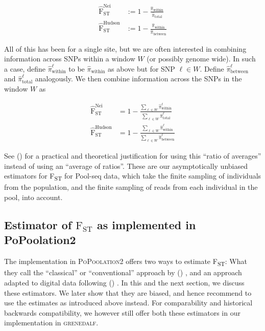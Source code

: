 \documentclass[a4paper,fontsize=9pt,DIV=14]{scrartcl}
\newcommand\citeay[1]{\citeauthor{#1} (\citeyear{#1}) \cite{#1}}
\newcommand\toolname{\textsc}
\newcommand{\fst}{F\textsubscript{ST}}
\begin{document}
\begin{align}
    \widehat{\text{F}}_\text{ST}^\text{Nei} &:= 1 - \frac{\widehat{\pi}_\text{within}}{\widehat{\pi}_\text{total}}\\
    \widehat{\text{F}}_\text{ST}^\text{Hudson} &:= 1 - \frac{\widehat{\pi}_\text{within}}{\widehat{\pi}_\text{between}}
\end{align}

All of this has been for a single site, but we are often interested in combining information across SNPs within a window $W$ (or possibly genome wide).
In such a case, define $\widehat{\pi}^\ell_\text{within}$ to be $\widehat{\pi}_\text{within}$ as above but for SNP $\ell \in W$.
Define $\widehat{\pi}^\ell_\text{between}$ and $\widehat{\pi}^\ell_\text{total}$ analogously.
We then combine information across the SNPs in the window $W$ as

\begin{align}
    \widehat{\text{F}}_\text{ST}^\text{Nei}    &= 1 - \frac{\sum_{\ell \in W} \widehat{\pi}^\ell_\text{within}} {\sum_{\ell \in W} \widehat{\pi}^\ell_\text{total}} \\
    \widehat{\text{F}}_\text{ST}^\text{Hudson} &= 1 - \frac{\sum_{\ell \in W} \widehat{\pi}^\ell_\text{within}} {\sum_{\ell \in W} \widehat{\pi}^\ell_\text{between}}
\end{align}

See \citeay{Bhatia2013} for a practical and theoretical justification for using this ``ratio of averages'' instead of using an ``average of ratios''.
These are our asymptotically unbiased estimators for \fst{} for Pool-seq data, which take the finite sampling of individuals from the population, and the finite sampling of reads from each individual in the pool, into account.


\subsection{Estimator of \texorpdfstring{$\text{F}_\text{ST}$}{FST} as implemented in PoPoolation2}
\label{supp:sec:FST:sub:PoPoolation2Estimator}

The implementation in \toolname{PoPoolation2} \cite{Kofler2011b} offers two ways to estimate \fst{}:
What they call the ``classical'' or ``conventional'' approach by \citeay{Hartl2007}, and an approach adapted to digital data following \citeay{Karlsson2007}.
In this and the next section, we discuss these estimators.
We later show that they are biased, and hence recommend to use the estimates as introduced above instead.
For comparability and historical backwards compatibility, we however still offer both these estimators in our implementation in \toolname{grenedalf}.
\end{document}
